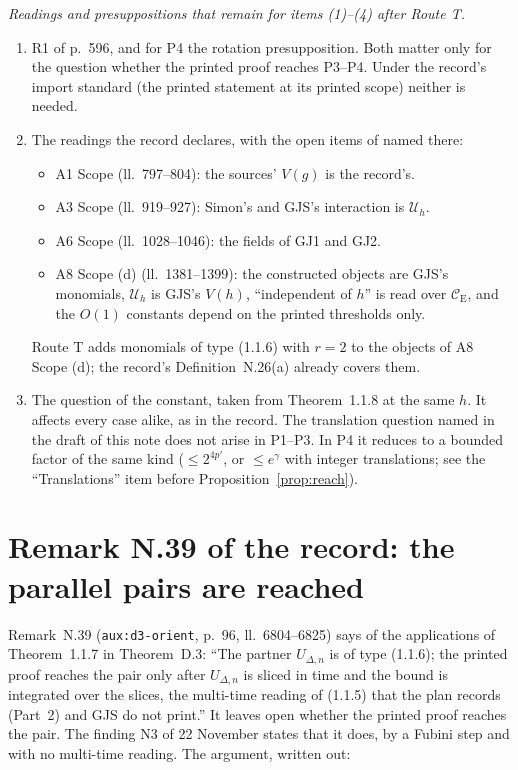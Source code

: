 \documentclass[11pt,a4paper]{article}
\newcommand{\CE}{\mathcal{C}_{\mathrm E}}
\newcommand{\Uc}{\mathcal U}
\theoremstyle{plain}
\theoremstyle{definition}
\begin{document}
\emph{Readings and presuppositions that remain for items (1)--(4) after Route T.}
\begin{enumerate}
\item R1 of p.~596, and for P4 the rotation presupposition.  Both matter only for the question
whether the printed proof reaches P3--P4.  Under the record's import standard (the printed
statement at its printed scope) neither is needed.
\item The readings the record declares, with the open items of
 named there:
  \begin{itemize}
  \item A1 Scope (ll.~797--804): the sources' $V(g)$ is the record's.
  \item A3 Scope (ll.~919--927): Simon's and GJS's interaction is $\Uc_h$.
  \item A6 Scope (ll.~1028--1046): the fields of GJ1 and GJ2.
  \item A8 Scope (d) (ll.~1381--1399): the constructed objects are GJS's monomials, $\Uc_h$ is
  GJS's $V(h)$, ``independent of $h$'' is read over $\CE$, and the $O(1)$ constants depend on the
  printed thresholds only.
  \end{itemize}
Route T adds monomials of type (1.1.6) with $r=2$ to the objects of A8 Scope (d); the record's
Definition~N.26(a) already covers them.
\item The question of the constant, taken from Theorem~1.1.8 at the same $h$.  It affects every
case alike, as in the record.  The translation question named in the draft of this note does not
arise in P1--P3.  In P4 it reduces to a bounded factor of the same kind ($\le2^{4p'}$, or
$\le e^\gamma$ with integer translations; see the ``Translations'' item before
Proposition~\ref{prop:reach}).
\end{enumerate}

\section{Remark N.39 of the record: the parallel pairs are reached}\label{sec:N39}

Remark~N.39 (\texttt{aux:d3-orient}, p.~96, ll.~6804--6825) says of the applications of
Theorem~1.1.7 in Theorem~D.3: ``The partner $U_{\Delta,n}$ is of type (1.1.6); the printed proof
reaches the pair only after $U_{\Delta,n}$ is sliced in time and the bound is integrated over the
slices, the multi-time reading of (1.1.5) that the plan records (Part~2) and GJS do not print.''
It leaves open whether the printed proof reaches the pair.  The finding N3 of 22 November states
that it does, by a Fubini step and with no multi-time reading.  The argument, written out:
\end{document}

